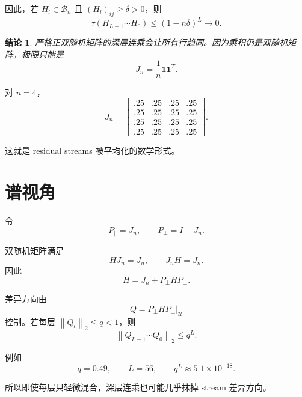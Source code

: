 \documentclass[UTF8,11pt]{ctexart}
\newtheorem{claim}{结论}
\newcommand{\one}{\mathbf{1}}
\newcommand{\Birkhoff}{\mathcal{B}_n}
\newcommand{\J}{J_n}
\newcommand{\norm}[1]{\left\lVert #1 \right\rVert}
\begin{document}
因此，若 $H_l\in\Birkhoff$ 且 $(H_l)_{ij}\ge\delta>0$，则
\begin{equation}
  \tau(H_{L-1}\cdots H_0)
  \le
  (1-n\delta)^L
  \to 0.
\end{equation}

\begin{claim}
严格正双随机矩阵的深层连乘会让所有行趋同。因为乘积仍是双随机矩阵，极限只能是
\begin{equation}
  \J=\frac1n\one\one^T.
\end{equation}
\end{claim}

对 $n=4$，
\begin{equation}
  \J
  =
  \begin{bmatrix}
  .25&.25&.25&.25\\
  .25&.25&.25&.25\\
  .25&.25&.25&.25\\
  .25&.25&.25&.25
  \end{bmatrix}.
\end{equation}

这就是 residual streams 被平均化的数学形式。

\section{谱视角}

令
\begin{equation}
  P_\parallel=\J,
  \qquad
  P_\perp=I-\J.
\end{equation}

双随机矩阵满足
\begin{equation}
  H\J=\J,
  \qquad
  \J H=\J.
\end{equation}
因此
\begin{equation}
  H=\J+P_\perp H P_\perp.
\end{equation}

差异方向由
\begin{equation}
  Q=P_\perp H P_\perp|_{\mathcal{U}}
\end{equation}
控制。若每层 $\norm{Q_l}_2\le q<1$，则
\begin{equation}
  \norm{Q_{L-1}\cdots Q_0}_2\le q^L.
\end{equation}

例如
\begin{equation}
  q=0.49,
  \qquad
  L=56,
  \qquad
  q^L\approx 5.1\times 10^{-18}.
\end{equation}

所以即使每层只轻微混合，深层连乘也可能几乎抹掉 stream 差异方向。
\end{document}
